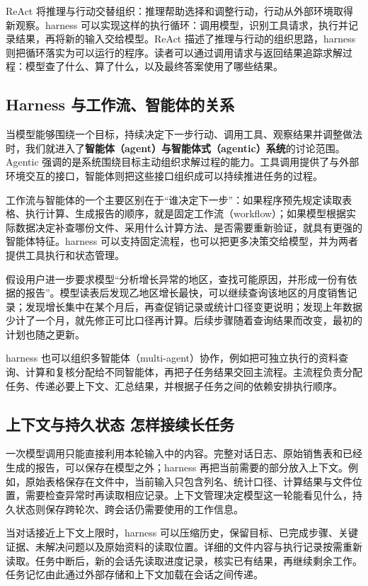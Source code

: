 ReAct 将推理与行动交替组织：推理帮助选择和调整行动，行动从外部环境取得新观察。harness 可以实现这样的执行循环：调用模型，识别工具请求，执行并记录结果，再将新的输入交给模型。ReAct 描述了推理与行动的组织思路，harness 则把循环落实为可以运行的程序。读者可以通过调用请求与返回结果追踪求解过程：模型查了什么、算了什么，以及最终答案使用了哪些结果。

\subsection{Harness 与工作流、智能体的关系}

当模型能够围绕一个目标，持续决定下一步行动、调用工具、观察结果并调整做法时，我们就进入了\textbf{智能体（agent）与智能体式（agentic）系统}的讨论范围。Agentic 强调的是系统围绕目标主动组织求解过程的能力。工具调用提供了与外部环境交互的接口，智能体则把这些接口组织成可以持续推进任务的过程。

工作流与智能体的一个主要区别在于``谁决定下一步''：如果程序预先规定读取表格、执行计算、生成报告的顺序，就是固定工作流（workflow）；如果模型根据实际数据决定补查哪份文件、采用什么计算方法、是否需要重新验证，就具有更强的智能体特征。harness 可以支持固定流程，也可以把更多决策交给模型，并为两者提供工具执行和状态管理。

假设用户进一步要求模型``分析增长异常的地区，查找可能原因，并形成一份有依据的报告''。模型读表后发现乙地区增长最快，可以继续查询该地区的月度销售记录；发现增长集中在某个月后，再查促销记录或统计口径变更说明；发现上年数据少计了一个月，就先修正可比口径再计算。后续步骤随着查询结果而改变，最初的计划也随之更新。

harness 也可以组织多智能体（multi-agent）协作，例如把可独立执行的资料查询、计算和复核分配给不同智能体，再把子任务结果交回主流程。主流程负责分配任务、传递必要上下文、汇总结果，并根据子任务之间的依赖安排执行顺序。

\subsection{上下文与持久状态 怎样接续长任务}

一次模型调用只能直接利用本轮输入中的内容。完整对话日志、原始销售表和已经生成的报告，可以保存在模型之外；harness 再把当前需要的部分放入上下文。例如，原始表格保存在文件中，当前输入只包含列名、统计口径、计算结果与文件位置，需要检查异常时再读取相应记录。上下文管理决定模型这一轮能看见什么，持久状态则保存跨轮次、跨会话仍需要使用的工作信息。

当对话接近上下文上限时，harness 可以压缩历史，保留目标、已完成步骤、关键证据、未解决问题以及原始资料的读取位置。详细的文件内容与执行记录按需重新读取。任务中断后，新的会话先读取进度记录，核实已有结果，再继续剩余工作。任务记忆由此通过外部存储和上下文加载在会话之间传递。

